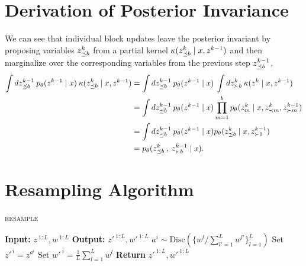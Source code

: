 \documentclass{article}
\theoremstyle{definition}
\begin{document}
\section{ Derivation of Posterior Invariance}
\label{appendix:posterior-invariance}
We can see that individual block updates leave the posterior invariant by proposing variables $z^k_{\preceq b}$ from a partial kernel $\kappa(z^k_{\preceq b} \mid x, z^{k-1})$ and then marginalize over the corresponding variables from the previous step $z^{k-1}_{\preceq b}$,
\begin{align*}
    \int 
    dz^{k-1}_{\preceq b} 
    \:
    p_\theta(z^{k-1} \mid x) 
    \: 
    \kappa(z^k_{\preceq b} \mid x, z^{k-1}) 
    &=
    \int 
    dz^{k-1}_{\preceq b} 
    \:
    p_\theta(z^{k-1} \mid x) 
    \: 
    \int dz^k_{\succ b}
    \:
    \kappa(z^k \mid x, z^{k-1})
    \\
    &= 
    \int 
    dz^{k-1}_{\preceq b} 
    \: 
    p_\theta(z^{k-1} \mid x)
    \prod_{m=1}^b p_\theta(z^k_m \mid x, z^{k}_{\prec m}, z^{k-1}_{\succ m})
    \\
    &=
    \int 
    dz^{k-1}_{\preceq b} 
    \: 
    p_\theta(z^{k-1} \mid x)
    p_\theta(z^k_{\preceq b} \mid x, z^{k-1}_{\succ 1})
    \\
    &=
    p_\theta(z^k_{\preceq b}\:, \: z^{k-1}_{\succ b} \mid x)
    .
\end{align*}

\section{Resampling Algorithm}
\label{appendix:resample-algo}
\begin{algorithm}[!t]
  \caption{\textsc{resample}}
  \label{alg:resample}
\begin{algorithmic}[1]
\small
  \State \textbf{Input:} $z^{\:1:L}, w^{\:1:L}$
  \State \textbf{Output:} $z'^{\:1:L}, w'^{\:1:L}$
    \State $a^i \sim \mathrm{Disc}(\{w^l / \sum_{l' = 1}^L w^{l'}\}_{l=1}^L)$ 
    \State Set $ z'^{\:i} = z^{a^i}$
    \State Set $ w'^{\:i} = \frac{1}{L} \sum_{l = 1}^L w^l$
    \EndFor
  \State \textbf{Return} $z'^{\:1:L}, w'^{\:1:L}$
\end{algorithmic}
\end{algorithm}
\end{document}
